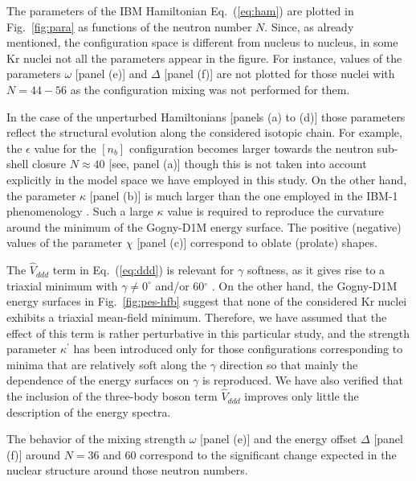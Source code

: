 \documentclass[twocolumn,showpacs,amsmath,amssymb,superscriptaddress]{revtex4-1}
\begin{document}
The parameters of the IBM Hamiltonian Eq.~(\ref{eq:ham}) are plotted 
in Fig.~\ref{fig:para} as functions of the neutron number $N$. 
Since, as already mentioned, the configuration space is different from nucleus
to nucleus, in some Kr nuclei not all the parameters appear in the figure. 
For instance, values of the parameters  $\omega$ [panel (e)] and $\Delta$ [panel (f)] are not
plotted for those nuclei with $N=44-56$ as the configuration mixing was 
not performed for them. 

In the case of the unperturbed Hamiltonians
[panels (a) to (d)] those parameters reflect the structural evolution
along the considered isotopic chain. For example, the $\epsilon$ value for the
$[n_b]$ configuration becomes larger towards the neutron sub-shell
closure $N\approx 40$ [see, panel
(a)] though this is not taken into account explicitly in the
model space we have employed in this study. On the other hand, the parameter
$\kappa$ [panel (b)] is much larger than the one employed in the 
IBM-1 phenomenology \cite{bai2016}. Such a large 
$\kappa$ value is required to reproduce 
the curvature around the minimum of the Gogny-D1M energy
surface. The positive (negative) values of the parameter $\chi$ [panel (c)]
correspond to  oblate (prolate) shapes. 

The $\hat V_{ddd}$ term in Eq.~(\ref{eq:ddd}) is relevant for $\gamma$
softness, as it gives rise to a triaxial minimum with $\gamma\neq
0^{\circ}$ and/or 60$^{\circ}$ \cite{vanisacker1981}. 
On the other hand, the Gogny-D1M energy surfaces in 
Fig.~\ref{fig:pes-hfb} suggest that none of the considered Kr nuclei exhibits
a triaxial mean-field
minimum. 
Therefore, we have assumed that the effect of this term is
rather perturbative in this particular study, and the strength parameter
$\kappa^{\prime}$ has 
been introduced only for those configurations
corresponding to minima that are relatively soft along the $\gamma$
direction so that mainly the dependence of the energy 
surfaces on $\gamma$  is reproduced. 
We have also verified that the inclusion of the three-body boson term
$\hat V_{ddd}$ improves only little the description of the energy spectra. 

The  behavior of the 
mixing strength $\omega$ [panel (e)]
and 
the energy offset $\Delta$ [panel (f)] around 
$N=36$ and 60 correspond to the significant change expected 
in the nuclear structure around those neutron numbers.



\end{document}
